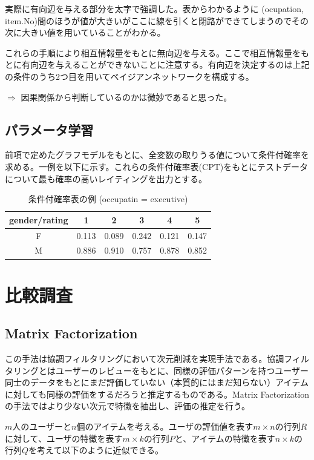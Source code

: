 \documentclass[a4j,12pt]{jarticle}
\begin{document}
実際に有向辺を与える部分を太字で強調した。表からわかるように (ocupation, item.No)間のほうが値が大きいがここに線を引くと閉路ができてしまうのでその次に大きい値を用いていることがわかる。

これらの手順により相互情報量をもとに無向辺を与える。ここで相互情報量をもとに有向辺を与えることができないことに注意する。有向辺を決定するのは上記の条件のうち2つ目を用いてベイジアンネットワークを構成する。

$\Rightarrow$ 因果関係から判断しているのかは微妙であると思った。

\subsection{パラメータ学習}

前項で定めたグラフモデルをもとに、全変数の取りうる値について条件付確率を求める。一例を以下に示す。これらの条件付確率表(CPT)をもとにテストデータについて最も確率の高いレイティングを出力とする。

\begin{table}[H]
\begin{center}
\caption{条件付確率表の例 (occupatin = executive)}
\begin{tabular}{|c||c|c|c|c|c|} \hline  
gender/rating & 1 & 2 & 3 & 4 & 5 \\ \hline \hline
F & 0.113 & 0.089 & 0.242 & 0.121 & 0.147 \\
M & 0.886 & 0.910 & 0.757 & 0.878 & 0.852 \\ \hline
\end{tabular}
\end{center}
\end{table}

\section{比較調査}

\subsection{Matrix Factorization}

この手法は協調フィルタリングにおいて次元削減を実現手法である。協調フィルタリングとはユーザーのレビューをもとに、同様の評価パターンを持つユーザー同士のデータをもとにまだ評価していない（本質的にはまだ知らない）アイテムに対しても同様の評価をするだろうと推定するものである。Matrix Factorization の手法ではより少ない次元で特徴を抽出し、評価の推定を行う。

$m$人のユーザーと$n$個のアイテムを考える。ユーザの評価値を表す$m \times n$の行列$R$に対して、ユーザの特徴を表す$m \times k$の行列$P$と、アイテムの特徴を表す$n \times k$の行列$Q$を考えて以下のように近似できる。
\end{document}
